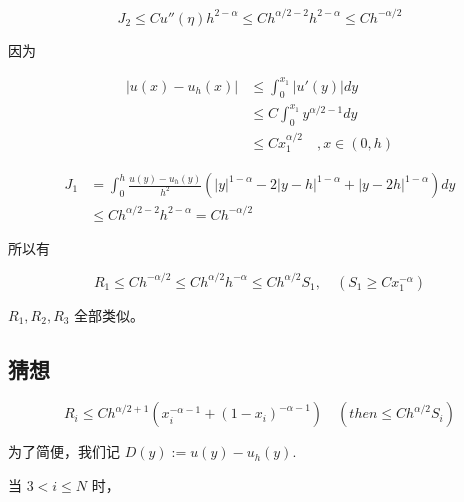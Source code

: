 \documentclass{ctexart}
\theoremstyle{definition}
\theoremstyle{remark}
\numberwithin{equation}{section}
\begin{document}
\begin{equation}
    J_2 \le C u''(\eta) h^{2-\alpha} \le C h^{\alpha/2-2} h^{2-\alpha} \le C h^{-\alpha/2}
\end{equation}

因为

\begin{equation}
    \begin{aligned}
        |u(x) - u_h(x)| & \le \int_0^{x_1} |u'(y)| dy                 \\
                        & \le C \int_0^{x_1} y^{\alpha/2-1} dy        \\
                        & \le C x_1^{\alpha/2}    \quad , x\in (0, h)
    \end{aligned}
\end{equation}


\begin{equation}
    \begin{aligned}
        J_1 & = \int_0^h \frac{ u(y) - u_h(y) }{h^2} (|y|^{1-\alpha} - 2|y-h|^{1-\alpha} + |y-2h|^{1-\alpha}) dy \\
            & \le C h^{\alpha/2-2} h^{2-\alpha} = C h^{-\alpha/2}
    \end{aligned}
\end{equation}

所以有

\begin{equation}
    R_1 \le C h^{-\alpha/2} \le C h^{\alpha/2} h^{-\alpha} \le C h^{\alpha/2} S_1, \quad (S_1\ge C x_1^{-\alpha})
\end{equation}


\(R_1, R_2, R_3\) 全部类似。

\subsection{猜想}

\begin{equation}
    R_i \le C h^{\alpha/2+1} (x_i^{-\alpha-1} + (1-x_i)^{-\alpha-1}) \quad (then \le C h^{\alpha/2} S_i)
\end{equation}

为了简便，我们记 \(D(y) := u(y) - u_h(y)\).

当 \(3<i\le N\) 时，
\end{document}

